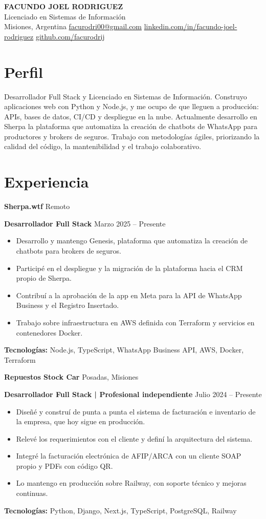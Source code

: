 \documentclass[10pt,a4paper]{article}
\newcommand{\cvheader}[6]{
  \begin{center}
    {\LARGE\bfseries\MakeUppercase{#1}}\\[3pt]
    {\color{muted}#2}\\[3pt]
    {#3 \textbullet{} \href{mailto:#4}{#4} \textbullet{} \href{https://#5}{#5} \textbullet{} \href{https://#6}{#6}}
  \end{center}
  \vspace{-4pt}
}
\newcommand{\experienceentry}[5]{
  \begingroup
  \setlength{\parskip}{0pt}
  \textbf{#1} \hfill {\color{muted}#3}\par
  \textbf{#2} \hfill {\color{muted}#4}
  #5
  \endgroup
  \vspace{4pt}
}
\begin{document}
\cvheader
  {Facundo Joel Rodriguez}
  {Licenciado en Sistemas de Información}
  {Misiones, Argentina}
  {facurodri00@gmail.com}
  {linkedin.com/in/facundo-joel-rodriguez}
  {github.com/facurodrij}

\section{Perfil}
Desarrollador Full Stack y Licenciado en Sistemas de Información. Construyo aplicaciones web con Python y Node.js, y me ocupo de que lleguen a producción: APIs, bases de datos, CI/CD y despliegue en la nube. Actualmente desarrollo en Sherpa la plataforma que automatiza la creación de chatbots de WhatsApp para productores y brokers de seguros. Trabajo con metodologías ágiles, priorizando la calidad del código, la mantenibilidad y el trabajo colaborativo.

\section{Experiencia}
\experienceentry
  {Sherpa.wtf}
  {Desarrollador Full Stack}
  {Remoto}
  {Marzo 2025 -- Presente}
  {\begin{itemize}
    \item Desarrollo y mantengo Genesis, plataforma que automatiza la creación de chatbots para brokers de seguros.
    \item Participé en el despliegue y la migración de la plataforma hacia el CRM propio de Sherpa.
    \item Contribuí a la aprobación de la app en Meta para la API de WhatsApp Business y el Registro Insertado.
    \item Trabajo sobre infraestructura en AWS definida con Terraform y servicios en contenedores Docker.
  \end{itemize}
  \textbf{Tecnologías:} Node.js, TypeScript, WhatsApp Business API, AWS, Docker, Terraform}

\experienceentry
  {Repuestos Stock Car}
  {Desarrollador Full Stack | Profesional independiente}
  {Posadas, Misiones}
  {Julio 2024 -- Presente}
  {\begin{itemize}
    \item Diseñé y construí de punta a punta el sistema de facturación e inventario de la empresa, que hoy sigue en producción.
    \item Relevé los requerimientos con el cliente y definí la arquitectura del sistema.
    \item Integré la facturación electrónica de AFIP/ARCA con un cliente SOAP propio y PDFs con código QR.
    \item Lo mantengo en producción sobre Railway, con soporte técnico y mejoras continuas.
  \end{itemize}
  \textbf{Tecnologías:} Python, Django, Next.js, TypeScript, PostgreSQL, Railway}
\end{document}
